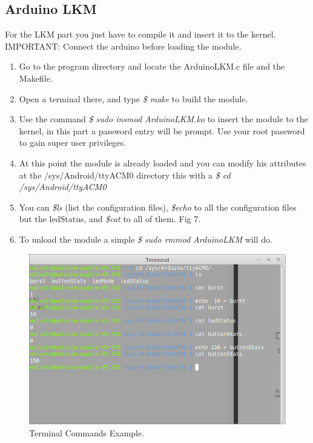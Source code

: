 \documentclass[12pt]{article}
\begin{document}
\subsection{Arduino LKM}
For the LKM part you just have to compile it and insert it to the kernel.
IMPORTANT: Connect the arduino before loading the module.
\begin{enumerate}
\item Go to the program directory and locate the ArduinoLKM.c file and the Makefile.
\item Open a terminal there, and type  \emph{\$ make} to build the module.
\item Use the command  \emph{\$ sudo insmod ArduinoLKM.ko} to insert the module to the kernel, in this part a password entry will be prompt. Use your root password to gain super user privileges.
\item At this point the module is already loaded and you can modify his attributes at the /sys/Android/ttyACM0 directory this with a \emph{\$ cd /sys/Android/ttyACM0}
\item You can  \emph{\$ls} (list the configuration files),  \emph{\$echo} to all the configuration files but the ledStatus, and  \emph{\$cat} to all of them. Fig 7.
\item To unload the module a simple \emph{\$ sudo rmmod ArduinoLKM} will do.
\end{enumerate}
\begin{figure}[h!]
 	\centering
  	\includegraphics[scale=0.5]
  	{Fig/terminal.png}    
  	\caption{Terminal Commands Example.}
    \label{Box}
\end{figure}

\end{document}
